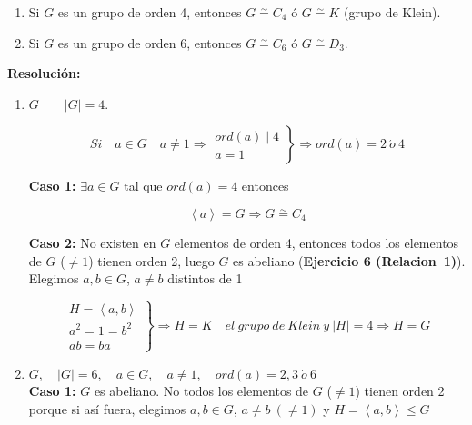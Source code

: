 \documentclass{article}
\begin{document}
\begin{enumerate}[(1)]
\item Si $G$ es un grupo de orden 4, entonces $G\overset{\sim}{=}C_4$ ó $G\overset{\sim}{=}K$ (grupo de Klein).

\item Si $G$ es un grupo de orden 6, entonces $G \overset{\sim}{=}C_6$ ó $G\overset{\sim}{=} D_3$.
\end{enumerate}

\textbf{Resolución:}
\begin{enumerate}[(1)]
\item $G \qquad |G|=4$. 

\begin{equation*}
Si\quad a\in G \quad a\neq 1 \Rightarrow \left. \begin{array}{c}
ord(a)\mid 4 \\
a=1
\end{array}\right\rbrace \Rightarrow ord(a)=2\: \acute{o}\: 4 
\end{equation*}

\textbf{Caso 1:} $\exists a\in G$ tal que $ord(a)=4$ entonces 

\begin{equation*}
\left\langle a \right\rangle =G\Rightarrow G\overset{\sim}{=}C_4
\end{equation*}

\textbf{Caso 2:} No existen en $G$ elementos de orden 4, entonces todos los elementos de $G$ ($\neq 1$) tienen orden 2, luego $G$ es abeliano (\textbf{Ejercicio 6 (Relacion~1)}). \\

Elegimos $a,b\in G$, $a\neq b$ distintos de 1

\begin{equation*}
\left. \begin{array}{c}
H=\left\langle a,b\right\rangle \\
a^2=1=b^2 \\
ab=ba
\end{array} \right\rbrace \Rightarrow H=K\quad el\:grupo\:de\:Klein\:y\:|H|=4\Rightarrow H=G
\end{equation*}

\item $G, \quad |G|=6, \quad a\in G,\quad a\neq 1,\quad ord(a)=2,3\:\acute{o}\:6$ \\

\textbf{Caso 1:} $G$ es abeliano. No todos los elementos de $G$ ($\neq 1$) tienen orden 2 porque si así fuera, elegimos $a,b\in G$, $a\neq b\:(\neq 1)$ y $H=\left\langle a,b\right\rangle \leq G$


\end{enumerate}
\end{document}

